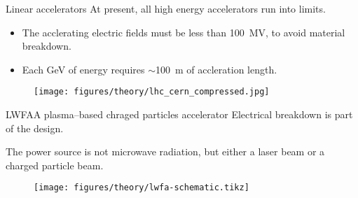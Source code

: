 \documentclass[dvipsnames]{beamer}
\begin{document}
\begin{frame}{Linear accelerators}
At present, all high energy accelerators run into limits.
\begin{itemize}
\item[\textbullet] The acclerating electric fields must be less than \SI{100}{\mega \V}, to avoid material breakdown.
\item[\textbullet] Each \si{\giga \eV} of energy requires $\sim$\SI{100}{\meter} of accleration length.
\end{itemize}
\begin{figure}
\texttt{[image: figures/theory/lhc\_cern\_compressed.jpg]}
\end{figure}
\end{frame}
\begin{frame}{LWFA}{A plasma--based chraged particles accelerator}
Electrical breakdown is part of the design.

The power source is not microwave radiation, but either a laser beam or a charged particle beam.
\begin{figure}
\texttt{[image: figures/theory/lwfa-schematic.tikz]}
\end{figure}
\end{frame}
\end{document}
